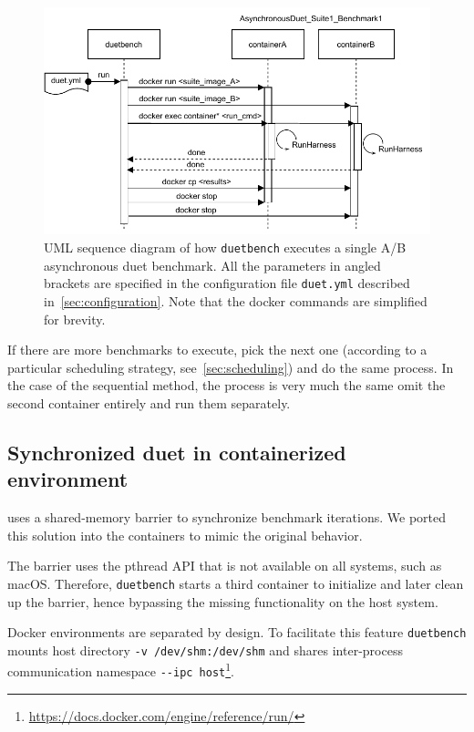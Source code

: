\begin{figure}[!ht]
    \centering
    \includegraphics[width=\linewidth]{./figures/duetbench-sequence.drawio.pdf}
    \caption{
        UML sequence diagram of how \lstinline{duetbench} executes a single A/B asynchronous duet benchmark.
        All the parameters in angled brackets are specified in the configuration file \lstinline{duet.yml} described in~\cref{sec:configuration}.
        Note that the docker commands are simplified for brevity.
    }
    \label{fig:duetbench_sequence}
\end{figure}

If there are more benchmarks to execute, pick the next one (according to a particular scheduling strategy, see~\cref{sec:scheduling}) and do the same process.
In the case of the sequential method, the process is very much the same omit the second container entirely and run them separately.

\subsection{Synchronized duet in containerized environment}
\label{sec:sync_duet_impl}

\citet{bulej2020duet} uses a \mbox{shared-memory} barrier to synchronize benchmark iterations.
We ported this solution into the containers to mimic the original behavior.

The barrier uses the pthread API that is not available on all systems, such as macOS.
Therefore, \lstinline{duetbench} starts a third container to initialize and later clean up the barrier, hence bypassing the missing functionality on the host system.

Docker environments are separated by design.
To facilitate this feature \lstinline{duetbench} mounts host directory \lstinline{-v /dev/shm:/dev/shm} and shares \mbox{inter-process} communication namespace \lstinline{--ipc host}\footnote{\url{https://docs.docker.com/engine/reference/run/}}.

